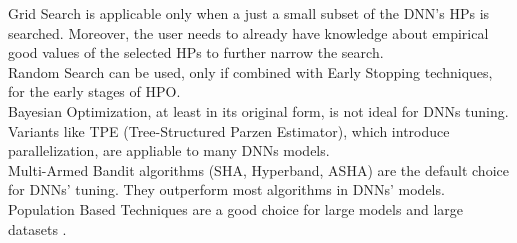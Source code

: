 Grid Search is applicable only when a just a small subset of the DNN's HPs is searched. Moreover, the user needs to already have knowledge about empirical good values of the selected HPs to further narrow the search.
\\[0.3cm]Random Search can be used, only if combined with Early Stopping techniques, for the early stages of HPO.
\\[0.3cm]Bayesian Optimization, at least in its original form, is not ideal for DNNs tuning. Variants like TPE (Tree-Structured Parzen Estimator), which introduce parallelization, are appliable to many DNNs models.
\\[0.3cm]Multi-Armed Bandit algorithms (SHA, Hyperband, ASHA) are the default choice for DNNs' tuning. They outperform most algorithms in DNNs' models.
\\[0.3cm]Population Based Techniques are a good choice for large models and large datasets \cite{Tesi-1.9}.